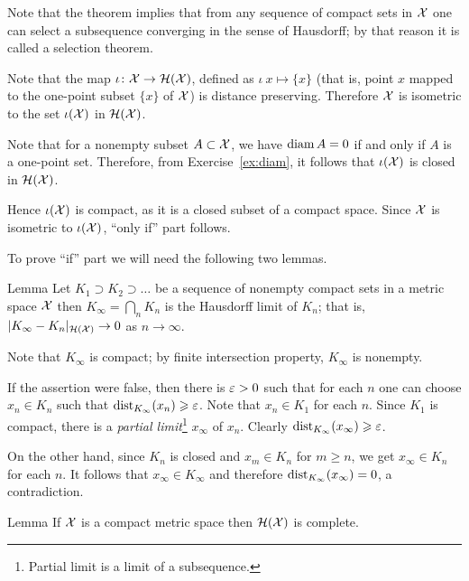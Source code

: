 Note that the theorem implies that from any sequence of compact sets in $\mathcal{X}$ one can select a subsequence converging in the sense of Hausdorff; 
by that reason it is called a selection theorem. 

Note that the map $\iota\colon\mathcal{X}\to \mathcal{H}(\mathcal{X})$, defined as $\iota\:x\mapsto\{x\}$
(that is, point $x$ mapped to the one-point subset $\{x\}$ of $\mathcal{X}$)
is distance preserving.
Therefore $\mathcal{X}$ is isometric to the set $\iota(\mathcal{X})$ in $\mathcal{H}(\mathcal{X})$.

Note that for a nonempty subset $A\subset \mathcal{X}$, we have $\operatorname{\rm diam}\nolimits A=0$ if and only if $A$ is a one-point set.
Therefore, from Exercise~\ref{ex:diam}, it follows 
that $\iota(\mathcal{X})$ is closed in $\mathcal{H}(\mathcal{X})$.

Hence $\iota(\mathcal{X})$  is compact, as it is a closed subset of a compact space. 
Since $\mathcal{X}$ is isometric to $\iota(\mathcal{X})$,
``only if'' part follows.
\qeds

To prove ``if'' part we will need the following two lemmas.%

\begin{thm}{Lemma}\label{lem:decreasing-converges}
Let $K_1\supset K_2\supset\dots$ be a sequence of nonempty compact sets in a metric space $\mathcal{X}$
then $K_\infty=\bigcap_n K_n$ is the Hausdorff limit of $K_n$;
that is, $|K_\infty-K_n|_{\mathcal{H}(\mathcal{X})}\to0$ as $n\to\infty$.
\end{thm}

Note that $K_\infty$ is compact;
by finite intersection property, $K_\infty$ is nonempty.

If the assertion were false, 
then there is $\varepsilon>0$ such that for each $n$ 
one can choose $x_n\in K_n$
such that $\mathrm{dist}_{K_\infty}(x_n)\geqslant\varepsilon$.
Note that $x_n\in K_1$ for each $n$.
Since $K_1$ is compact, 
there is 
a \emph{partial limit}\footnote{Partial limit is a limit of a subsequence.}
 $x_\infty$ of $x_n$.
Clearly $\mathrm{dist}_{K_\infty}(x_\infty)\geqslant \varepsilon$.

On the other hand, since $K_n$ is closed and $x_m\in K_n$ for $m\ge n$,
we get $x_\infty\in K_n$ for each $n$.
It follows that $x_\infty\in K_\infty$ and therefore $\mathrm{dist}_{K_\infty}(x_\infty)=0$,
a contradiction.\qeds


\begin{thm}{Lemma}\label{lem:complete+Hausdorff}
If $\mathcal{X}$ is a compact metric space then $\mathcal{H}(\mathcal{X})$
is complete.
\end{thm}

